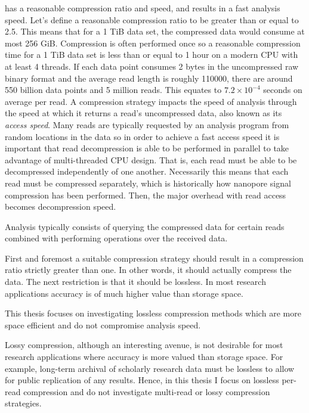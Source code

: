 has a reasonable compression ratio and speed, and results in a fast analysis speed. Let's define a reasonable compression ratio to be greater than or equal to 2.5. This means that for a 1 TiB data set, the compressed data would consume at most 256 GiB. Compression is often performed once so a reasonable compression time for a 1 TiB data set is less than or equal to 1 hour on a modern CPU with at least 4 threads. If each data point consumes 2 bytes in the uncompressed raw binary format and the average read length is roughly \num{110000}, there are around 550 billion data points and 5 million reads. This equates to $7.2\times 10^{-4}$ seconds on average per read. A compression strategy impacts the speed of analysis through the speed at which it returns a read's uncompressed data, also known as its \textit{access speed}. Many reads are typically requested by an analysis program from random locations in the data so in order to achieve a fast access speed it is important that read decompression is able to be performed in parallel to take advantage of multi-threaded CPU design. That is, each read must be able to be decompressed independently of one another. Necessarily this means that each read must be compressed separately, which is historically how nanopore signal compression has been performed. Then, the major overhead with read access becomes decompression speed.

Analysis typically consists of querying the compressed data for certain reads combined with performing operations over the received data.

First and foremost a suitable compression strategy should result in a compression ratio strictly greater than one. In other words, it should actually compress the data.
The next restriction is that it should be lossless. In most research applications accuracy is of much higher value than storage space.

This thesis focuses on investigating lossless compression methods which are more space efficient and do not compromise analysis speed.


Lossy compression, although an interesting avenue, is not desirable for most research applications where accuracy is more valued than storage space. For example, long-term archival of scholarly research data must be lossless to allow for public replication of any results.
Hence, in this thesis I focus on lossless per-read compression and do not investigate multi-read or lossy compression strategies.
